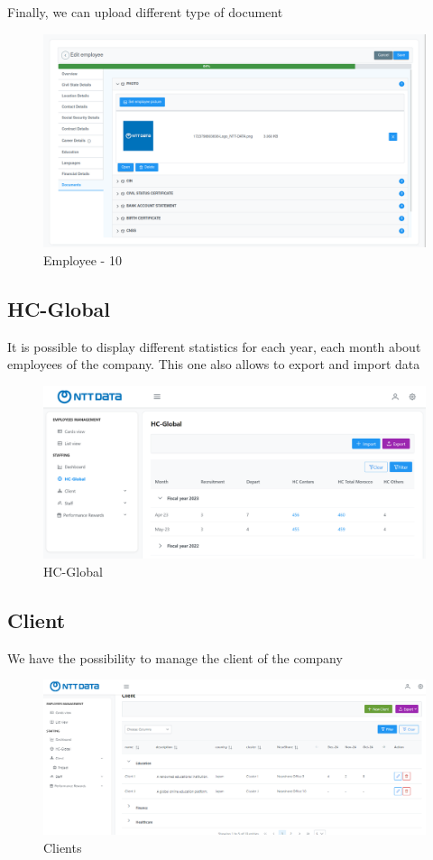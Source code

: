 \documentclass[12pt,a4paper,table,english]{article}
\begin{document}
	Finally, we can upload different type of document
	\begin{figure}[H]
		\centering
		\includegraphics[width=150mm]{Image/employee10}
		\caption{Employee - 10}
		\label{fig:Employee - 10}
	\end{figure}

	
	\subsection{HC-Global}
	It is possible to display different statistics for each year, each month about employees of the company. This one also allows to export and import data
	
	\begin{figure}[H]
		\centering
		\includegraphics[width=150mm]{Image/hcglobal}
		\caption{HC-Global}
		\label{fig:HC-Global}
	\end{figure}


	\subsection{Client}
	We have the possibility to manage the client of the company
	
	\begin{figure}[H]
		\centering
		\includegraphics[width=150mm]{Image/clients}
		\caption{Clients}
		\label{fig:Clients}
	\end{figure}
	
\end{document}
